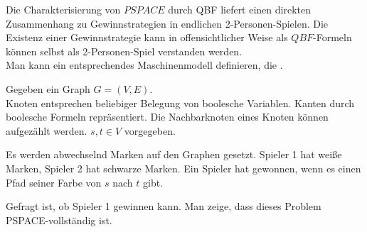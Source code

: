 Die Charakterisierung von $PSPACE$ durch QBF liefert einen direkten Zusammenhang zu Gewinnstrategien in endlichen 2-Personen-Spielen.
Die Existenz einer Gewinnstrategie kann in offensichtlicher Weise als $QBF$-Formeln können selbst als 2-Personen-Spiel verstanden werden.
\\
Man kann ein entsprechendes Maschinenmodell definieren, die .






\begin{beispiel}
    

    Gegeben ein Graph $G = (V,E)$.
    \\
    Knoten entsprechen beliebiger Belegung von boolesche Variablen. Kanten durch boolesche Formeln repräsentiert. Die Nachbarknoten eines Knoten können aufgezählt werden. $s, t \in V$ vorgegeben.

    Es werden abwechselnd Marken auf den Graphen gesetzt. Spieler 1 hat weiße Marken, Spieler 2 hat schwarze Marken. Ein Spieler hat gewonnen, wenn es einen Pfad seiner Farbe von $s$ nach $t$ gibt.

    Gefragt ist, ob Spieler 1 gewinnen kann. Man zeige, dass dieses Problem PSPACE-vollständig ist.

\end{beispiel}

















